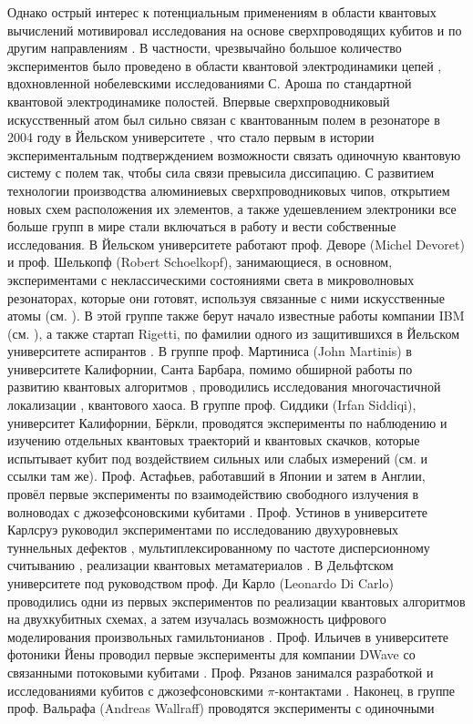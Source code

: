 \documentclass[14pt, a4paper]{extarticle}
\begin{document}
Однако острый интерес к потенциальным применениям в области квантовых вычислений мотивировал исследования на основе сверхпроводящих кубитов и по другим направлениям \cite{kjaergaard2020superconducting}. В частности, чрезвычайно большое количество экспериментов было проведено в области квантовой электродинамики цепей \cite{blais2020quantum}, вдохновленной нобелевскими исследованиями С. Ароша \cite{haroche2013nobel} по стандартной квантовой электродинамике полостей. Впервые сверхпроводниковый искусственный атом был сильно связан с квантованным полем в резонаторе в 2004 году в Йельском университете \cite{wallraff2004strong}, что стало первым в истории экспериментальным подтверждением возможности связать одиночную квантовую систему с полем так, чтобы сила связи превысила диссипацию. С развитием технологии производства алюминиевых сверхпроводниковых чипов, открытием новых схем расположения их элементов, а также удешевлением электроники все больше групп в мире стали включаться в работу и вести собственные исследования. В Йельском университете работают проф. Деворе (Michel Devoret) и проф. Шелькопф (Robert Schoelkopf), занимающиеся, в основном, экспериментами с неклассическими состояниями света в микроволновых резонаторах, которые они готовят, используя связанные с ними искусственные атомы (см. \cite{vlastakis2013deterministically, mirrahimi2014dynamically}). В этой группе также берут начало известные работы компании IBM (см. \cite{jurcevic2020demonstration}), а также стартап Rigetti, по фамилии одного из защитившихся в Йельском университете аспирантов \cite{reagor2018demonstration}. В группе проф. Мартиниса (John Martinis) в университете Калифорнии, Санта Барбара, помимо обширной работы по развитию квантовых алгоритмов \cite{arute2019quantum}, проводились исследования многочастичной локализации \cite{chen2014emulating, roushan2017spectroscopic}, квантового хаоса. В группе проф. Сиддики (Irfan Siddiqi), университет Калифорнии, Бёркли, проводятся эксперименты по наблюдению и изучению отдельных квантовых траекторий и квантовых скачков, которые испытывает кубит под воздействием сильных или слабых измерений (см. \cite{hacohen2016quantum} и ссылки там же). Проф. Астафьев, работавший в Японии и затем в Англии, провёл первые эксперименты по взаимодействию свободного излучения в волноводах с джозефсоновскими кубитами \cite{astafiev2010resonance}. Проф. Устинов в университете Карлсруэ руководил экспериментами по исследованию двухуровневых туннельных дефектов \cite{grabovskij2012strain}, мультиплексированному по частоте дисперсионному считыванию \cite{jerger2012frequency}, реализации квантовых метаматериалов \cite{macha2014implementation}. В Дельфтском университете под руководством проф. Ди Карло (Leonardo Di Carlo) проводились одни из первых экспериментов по реализации квантовых алгоритмов на двухкубитных схемах, а затем изучалась возможность цифрового моделирования произвольных гамильтонианов \cite{langford2017experimentally}. Проф. Ильичев в университете фотоники Йены проводил первые эксперименты для компании DWave со связанными потоковыми кубитами \cite{grajcar2006four}. Проф. Рязанов занимался разработкой и исследованиями кубитов с джозефсоновскими $\pi$-контактами \cite{feofanov2010implementation}. Наконец, в группе проф. Вальрафа (Andreas Wallraff) проводятся эксперименты с одиночными 
\end{document}
